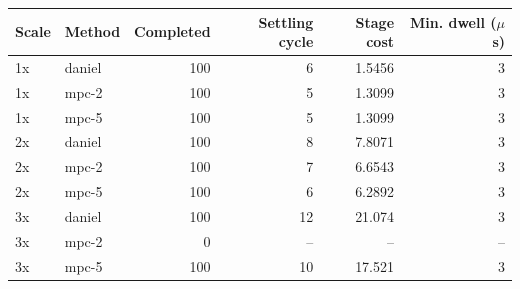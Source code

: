 \begin{tabular}{llrrrr}
\toprule
Scale & Method & Completed & Settling cycle & Stage cost & Min. dwell ($\mu$s) \\ \midrule
1x & daniel & 100 & 6 & 1.5456 & 3 \\ 
1x & mpc-2 & 100 & 5 & 1.3099 & 3 \\ 
1x & mpc-5 & 100 & 5 & 1.3099 & 3 \\ 
2x & daniel & 100 & 8 & 7.8071 & 3 \\ 
2x & mpc-2 & 100 & 7 & 6.6543 & 3 \\ 
2x & mpc-5 & 100 & 6 & 6.2892 & 3 \\ 
3x & daniel & 100 & 12 & 21.074 & 3 \\ 
3x & mpc-2 & 0 & -- & -- & -- \\ 
3x & mpc-5 & 100 & 10 & 17.521 & 3 \\ 
\bottomrule
\end{tabular}
